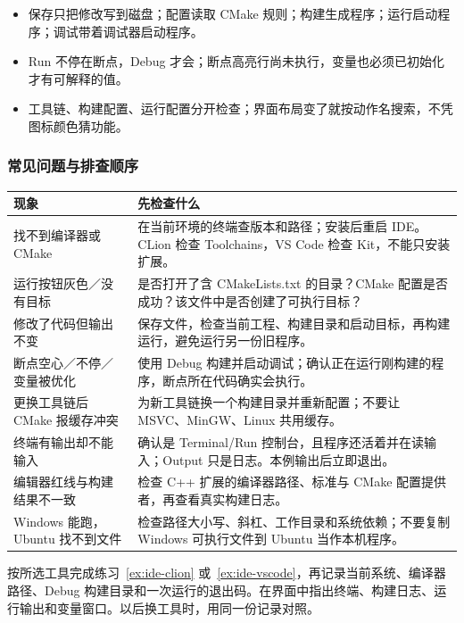 \begin{conclusion}
\begin{itemize}
\item 保存只把修改写到磁盘；配置读取 CMake 规则；构建生成程序；运行启动程序；调试带着调试器启动程序。
\item Run 不停在断点，Debug 才会；断点高亮行尚未执行，变量也必须已初始化才有可解释的值。
\item 工具链、构建配置、运行配置分开检查；界面布局变了就按动作名搜索，不凭图标颜色猜功能。
\end{itemize}
\end{conclusion}

\subsubsection{常见问题与排查顺序}
\begingroup\small
\begin{longtable}{p{}p{}}
\toprule[1.5pt]
现象 & 先检查什么\\
\midrule[1pt]\endhead
找不到编译器或 CMake & 在当前环境的终端查版本和路径；安装后重启 IDE。CLion 检查 Toolchains，VS Code 检查 Kit，不能只安装扩展。\\
运行按钮灰色／没有目标 & 是否打开了含 CMakeLists.txt 的目录？CMake 配置是否成功？该文件中是否创建了可执行目标？\\
修改了代码但输出不变 & 保存文件，检查当前工程、构建目录和启动目标，再构建运行，避免运行另一份旧程序。\\
断点空心／不停／变量被优化 & 使用 Debug 构建并启动调试；确认正在运行刚构建的程序，断点所在代码确实会执行。\\
更换工具链后 CMake 报缓存冲突 & 为新工具链换一个构建目录并重新配置；不要让 MSVC、MinGW、Linux 共用缓存。\\
终端有输出却不能输入 & 确认是 Terminal/Run 控制台，且程序还活着并在读输入；Output 只是日志。本例输出后立即退出。\\
编辑器红线与构建结果不一致 & 检查 C++ 扩展的编译器路径、标准与 CMake 配置提供者，再查看真实构建日志。\\
Windows 能跑，Ubuntu 找不到文件 & 检查路径大小写、斜杠、工作目录和系统依赖；不要复制 Windows 可执行文件到 Ubuntu 当作本机程序。\\
\bottomrule[1.5pt]
\end{longtable}\endgroup

\begin{exercise}\label{ex:ide-setup}
按所选工具完成练习~\ref{ex:ide-clion} 或~\ref{ex:ide-vscode}，再记录当前系统、编译器路径、Debug 构建目录和一次运行的退出码。在界面中指出终端、构建日志、运行输出和变量窗口。以后换工具时，用同一份记录对照。
\end{exercise}

